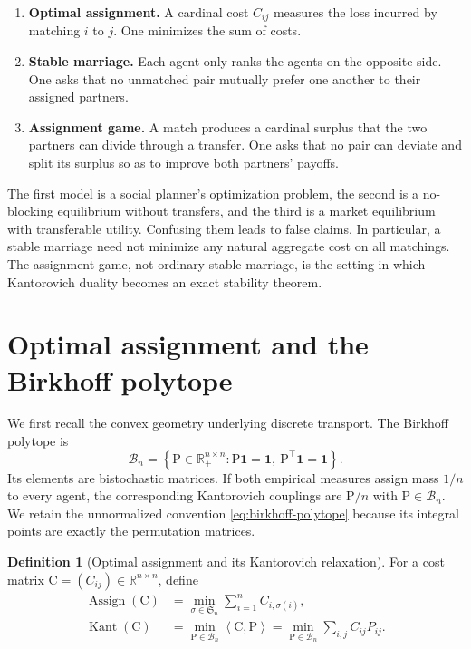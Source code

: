 \documentclass[11pt]{article}
\theoremstyle{definition}
\newtheorem{definition}[theorem]{Definition}
\theoremstyle{remark}
\newcommand{\R}{\mathbb R}
\newcommand{\one}{\mathbf 1}
\newcommand{\Perm}{\mathfrak S}
\newcommand{\Pmat}{\mathrm P}
\newcommand{\Cmat}{\mathrm C}
\newcommand{\Bcal}{\mathcal B}
\newcommand{\ip}[2]{\left\langle #1,#2\right\rangle}
\begin{document}
\begin{enumerate}[label=\textbf{\arabic*.},leftmargin=2.7em]
  \item \textbf{Optimal assignment.} A cardinal cost $C_{ij}$ measures the
  loss incurred by matching $i$ to $j$. One minimizes the sum of costs.
  \item \textbf{Stable marriage.} Each agent only ranks the agents on the
  opposite side. One asks that no unmatched pair mutually prefer one another
  to their assigned partners.
  \item \textbf{Assignment game.} A match produces a cardinal surplus that
  the two partners can divide through a transfer. One asks that no pair can
  deviate and split its surplus so as to improve both partners' payoffs.
\end{enumerate}

The first model is a social planner's optimization problem, the second is a
no-blocking equilibrium without transfers, and the third is a market
equilibrium with transferable utility. Confusing them leads to false claims.
In particular, a stable marriage need not minimize any natural aggregate cost
on all matchings. The assignment game, not ordinary stable marriage, is the
setting in which Kantorovich duality becomes an exact stability theorem.

\section{Optimal assignment and the Birkhoff polytope}
\label{sec:birkhoff}

We first recall the convex geometry underlying discrete transport. The
Birkhoff polytope is
\begin{equation}\label{eq:birkhoff-polytope}
  \Bcal_n
  =\left\{\Pmat\in\R_+^{n\times n}:
  \Pmat\one=\one,\ \Pmat^\top\one=\one\right\}.
\end{equation}
Its elements are bistochastic matrices. If both empirical measures assign mass
\(1/n\) to every agent, the corresponding Kantorovich couplings are
$\Pmat/n$ with $\Pmat\in\Bcal_n$. We retain the unnormalized convention
\eqref{eq:birkhoff-polytope} because its integral points are exactly the
permutation matrices.

\begin{definition}[Optimal assignment and its Kantorovich relaxation]
For a cost matrix $\Cmat=(C_{ij})\in\R^{n\times n}$, define
\begin{align}
  \operatorname{Assign}(\Cmat)
  &=\min_{\sigma\in\Perm_n}\sum_{i=1}^n C_{i,\sigma(i)},
  \label{eq:assignment}\\
  \operatorname{Kant}(\Cmat)
  &=\min_{\Pmat\in\Bcal_n}\ip{\Cmat}{\Pmat}
  =\min_{\Pmat\in\Bcal_n}\sum_{i,j}C_{ij}P_{ij}.
  \label{eq:kantorovich-assignment}
\end{align}
\end{definition}
\end{document}
